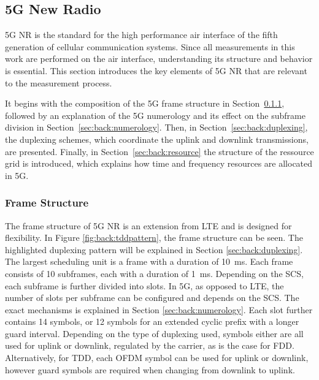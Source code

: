 \subsection{5G New Radio}

5G \gls{NR} is the standard for the high performance air interface of the fifth generation of cellular communication systems.
Since all measurements in this work are performed on the air interface, understanding its structure and behavior is essential.
This section introduces the key elements of 5G \gls{NR} that are relevant to the measurement process.

It begins with the composition of the 5G frame structure in Section~\ref{sec:back:frame}, followed by an explanation
of the 5G numerology and its effect on the subframe division in Section~\ref{sec:back:numerology}.
Then, in Section~\ref{sec:back:duplexing}, the duplexing schemes, which coordinate the uplink and downlink transmissions, are presented.
Finally, in Section~\ref{sec:back:resource} the structure of the ressource grid is introduced, which explains how time and frequency resources are allocated in 5G.


\subsubsection{Frame Structure}\label{sec:back:frame}
The frame structure of 5G \gls{NR} is an extension from \gls{LTE} and is designed for flexibility.
In Figure \ref{fig:back:tddpattern}, the frame structure can be seen.
The highlighted duplexing pattern will be explained in Section \ref{sec:back:duplexing}.
The largest scheduling unit is a frame with a duration of \SI{10}{\milli\second}.
Each frame consists of 10 subframes, each with a duration of \SI{1}{\milli\second}.
Depending on the \gls{SCS}, each subframe is further divided into slots.
In 5G, as opposed to \gls{LTE}, the number of slots per subframe can be configured and depends on the \gls{SCS}.
The exact mechanisms is explained in Section \ref{sec:back:numerology}.
Each slot further contains 14 symbols, or 12 symbols for an extended cyclic prefix with a longer guard interval.
Depending on the type of duplexing used, symbols either are all used for uplink or downlink, regulated by the carrier,
as is the case for \gls{FDD}.
Alternatively, for \gls{TDD}, each \gls{OFDM} symbol can be used for uplink or downlink, however guard symbols are
required when changing from downlink to uplink.
\cite{hui2018channel,3gpp38.211,3gpp38.912}

